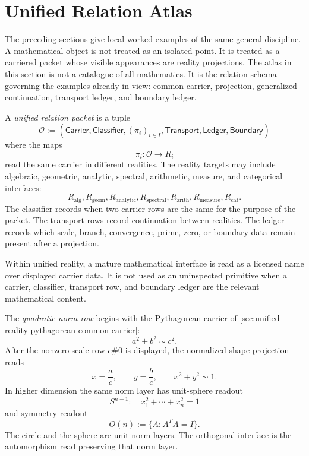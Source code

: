 \section{Unified Relation Atlas}
\label{sec:unified-reality-relation-atlas}

The preceding sections give local worked examples of the same general
discipline. A mathematical object is not treated as an isolated point.
It is treated as a carriered packet whose visible appearances are
reality projections. The atlas in this section is not a catalogue of all
mathematics. It is the relation schema governing the examples already in
view: common carrier, projection, generalized continuation, transport
ledger, and boundary ledger.

\begin{definition}
\label{def:unified-reality-relation-packet}
A \emph{unified relation packet} is a tuple
$$
\mathcal O
:=
(\mathsf{Carrier},\mathsf{Classifier},(\pi_i)_{i\in I},
\mathsf{Transport},\mathsf{Ledger},\mathsf{Boundary})
$$
where the maps
$$
\pi_i:\mathcal O\to R_i
$$
read the same carrier in different realities. The reality targets may
include algebraic, geometric, analytic, spectral, arithmetic, measure,
and categorical interfaces:
$$
R_{\mathrm{alg}},
R_{\mathrm{geom}},
R_{\mathrm{analytic}},
R_{\mathrm{spectral}},
R_{\mathrm{arith}},
R_{\mathrm{measure}},
R_{\mathrm{cat}}.
$$
The classifier records when two carrier rows are the same for the
purpose of the packet. The transport rows record continuation between
realities. The ledger records which scale, branch, convergence, prime,
zero, or boundary data remain present after a projection.
\end{definition}

\begin{principle}
\label{prin:unified-reality-carriered-relation-before-object-isolation}
Within unified reality, a mature mathematical interface is read as a
licensed name over displayed carrier data. It is not used as an
uninspected primitive when a carrier, classifier, transport row, and
boundary ledger are the relevant mathematical content.
\end{principle}

\begin{definition}
\label{def:unified-reality-quadratic-norm-atlas-row}
The \emph{quadratic-norm row} begins with the Pythagorean carrier of
\autoref{sec:unified-reality-pythagorean-common-carrier}:
$$
a^2+b^2\sim c^2.
$$
After the nonzero scale row $c\#0$ is displayed, the normalized shape
projection reads
$$
x=\frac ac,
\qquad
y=\frac bc,
\qquad
x^2+y^2\sim1.
$$
In higher dimension the same norm layer has unit-sphere readout
$$
S^{n-1}:\quad x_1^2+\cdots+x_n^2=1
$$
and symmetry readout
$$
O(n):=\{A:A^TA=I\}.
$$
The circle and the sphere are unit norm layers. The orthogonal
interface is the automorphism read preserving that norm layer.
\end{definition}

